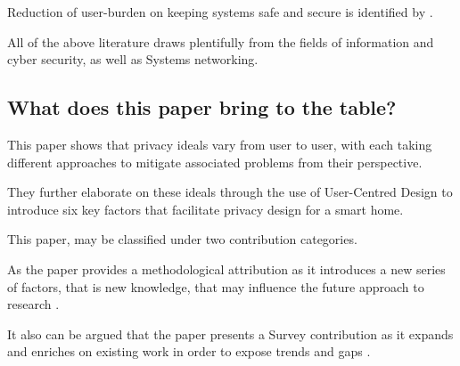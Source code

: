 Reduction of user-burden on keeping systems safe and secure is identified by \textcite{23}.

All of the above literature draws plentifully from the fields of information and cyber security,  as well as Systems networking.

\subsection{What does this paper bring to the table?}

This paper shows that privacy ideals vary from user to user, with each taking different approaches to mitigate associated problems from their perspective. 

They further elaborate on these ideals through the use of User-Centred Design to introduce six key factors that facilitate privacy design for a smart home.

This paper, may be classified under two contribution categories.

As the paper provides a methodological attribution as it introduces a new series of factors, that is new knowledge, that may influence the future approach to research \parencite{acmMethods}.

It also can be argued that the paper presents a Survey contribution as it expands and enriches on existing work in order to expose trends and gaps \parencite{acmMethods}.